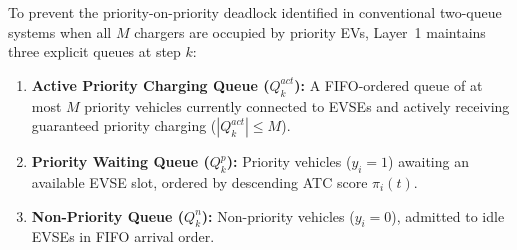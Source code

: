 \documentclass[final,3p,times,twocolumn]{elsarticle}
\begin{document}
To prevent the priority-on-priority deadlock identified in conventional two-queue systems when all $M$ chargers are occupied by priority EVs, Layer~1 maintains three explicit queues at step $k$:
\begin{enumerate}
    \item \textbf{Active Priority Charging Queue ($Q_k^{act}$):} A FIFO-ordered queue of at most $M$ priority vehicles currently connected to EVSEs and actively receiving guaranteed priority charging ($|Q_k^{act}| \le M$).
    \item \textbf{Priority Waiting Queue ($Q_k^p$):} Priority vehicles ($y_i = 1$) awaiting an available EVSE slot, ordered by descending ATC score $\pi_i(t)$.
    \item \textbf{Non-Priority Queue ($Q_k^n$):} Non-priority vehicles ($y_i = 0$), admitted to idle EVSEs in FIFO arrival order.
\end{enumerate}
\end{document}
